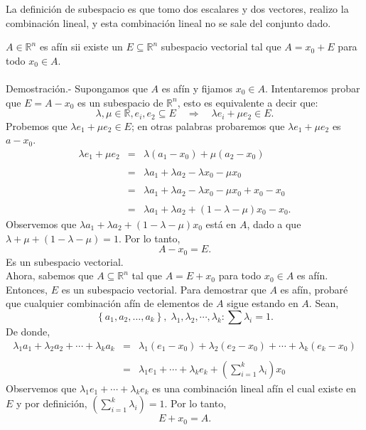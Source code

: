 \begin{nota}
La definición de subespacio es que tomo dos escalares y dos vectores, realizo la combinación lineal, y esta combinación lineal no se sale del conjunto dado.
\end{nota}


\begin{teo}
    $A\in \mathbb{R}^n$ es afín sii existe un $E\subseteq \mathbb{R}^n$ subespacio vectorial tal que $A=x_0+E$ para todo $x_0\in A$.\\\\
	Demostración.-\; Supongamos que $A$ es afín y fijamos $x_0\in A$. Intentaremos probar que $E=A-x_0$ es un subespacio de $\mathbb{R}^n$, esto es equivalente a decir que:
	$$\lambda,\mu \in \mathbb{R}, e_i,e_2\subseteq E \quad \Rightarrow \quad \lambda e_i+\mu e_2\in E.$$
	Probemos que $\lambda e_1+\mu e_2\in E$; en otras palabras probaremos que $\lambda e_1+\mu e_2$ es $a-x_0$.
	$$
	\begin{array}{rcl}
	    \lambda e_1+\mu e_2&=&\lambda(a_1-x_0)+\mu(a_2-x_0)\\\\
			       &=&\lambda a_1 + \lambda a_2 - \lambda x_0-\mu x_0\\\\
			       &=&\lambda a_1 + \lambda a_2 - \lambda x_0-\mu x_0 +x_0-x_0\\\\
			       &=&\lambda a_1 + \lambda a_2+(1-\lambda-\mu)x_0-x_0.
	\end{array}
	$$
	Observemos que $\lambda a_1 + \lambda a_2+(1-\lambda-\mu)x_0$ está en $A$, dado a que $\lambda+\mu+(1-\lambda-\mu)=1$. Por lo tanto,
	$$A-x_0=E.$$
	Es un subespacio vectorial.\\

	Ahora, sabemos que $A\subseteq \mathbb{R}^n$ tal que $A=E+x_0$ para todo $x_0\in A$ es afín. Entonces, $E$ es un subespacio vectorial. Para demostrar que $A$ es afín, probaré que cualquier combinación afín de elementos de $A$ sigue estando en $A$. Sean,
	$$\left\{a_1,a_2,\ldots,a_k\right\},\; \lambda_1,\lambda_2,\cdots,\lambda_k:\sum \lambda_i=1.$$
	De donde,
	$$
	\begin{array}{rcl}
	    \lambda_1a_1+\lambda_2a_2+\cdots+\lambda_ka_k&=&\lambda_1(e_1-x_0)+\lambda_2(e_2-x_0)+\cdots+\lambda_k(e_k-x_0)\\\\
							   &=& \lambda_1e_1+\cdots+\lambda_ke_k+\left(\displaystyle\sum_{i=1}^k \lambda_i\right)x_0
	\end{array}
	$$
	Observemos que $\lambda_1e_1+\cdots+\lambda_ke_k$ es una combinación lineal afín el cual existe en $E$ y por definición, $\left(\displaystyle\sum_{i=1}^k \lambda_i\right)=1$. Por lo tanto,
	$$E+x_0=A.$$
\end{teo}


